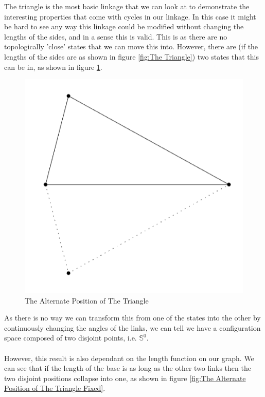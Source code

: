 \documentclass{article}
\begin{document}
\noindent The triangle is the most basic linkage that we can look at to demonstrate the interesting properties that come with cycles in our linkage. In this case it might be hard to see any way this linkage could be modified without changing the lengths of the sides, and in a sense this is valid. This is as there are no topologically 'close' states that we can move this into. However, there are (if the lengths of the sides are as shown in figure \ref{fig:The Triangle}) two states that this can be in, as shown in figure \ref{fig:The Alternate Position of The Triangle}. 

\begin{figure}[h!]
\centering
\includegraphics[scale=0.5]{./images/triangle_alt_switch}
\caption{The Alternate Position of The Triangle}
\label{fig:The Alternate Position of The Triangle}
\end{figure}

\noindent As there is no way we can transform this from one of the states into the other by continuously changing the angles of the links, we can tell we have a configuration space composed of two disjoint points, i.e. $\mathbb S^0$. \\\\ However, this result is also dependant on the length function on our graph. We can see that if the length of the base is as long as the other two links then the two disjoint positions collapse into one, as shown in figure \ref{fig:The Alternate Position of The Triangle Fixed}.
\end{document}
